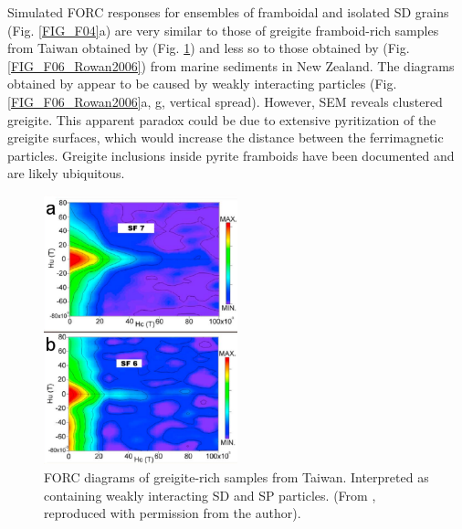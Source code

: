 Simulated FORC responses for ensembles of framboidal and isolated SD grains (Fig. \ref{FIG_F04}a) are very similar to those of greigite framboid-rich samples from Taiwan obtained by \citet{Chou2012} (Fig. \ref{FIG_F06_Chou2012}) and less so to those obtained by \citet{Rowan2006} (Fig. \ref{FIG_F06_Rowan2006}) from marine sediments in New Zealand. The diagrams obtained by \citet{Rowan2006} appear to be caused by weakly interacting particles (Fig. \ref{FIG_F06_Rowan2006}a, g, vertical spread). However, SEM reveals clustered greigite. This apparent paradox could be due to extensive pyritization of the greigite surfaces, which would increase the distance between the ferrimagnetic particles. Greigite inclusions inside pyrite framboids have been documented \citep{Ebert2018} and are likely ubiquitous.
\begin{figure}
\centering
\includegraphics[width=0.5\textwidth]{research-4/figs/Chou2012.pdf}
\caption[FORC diagram of greigite-rich samples from Taiwan]{FORC diagrams of greigite-rich samples from Taiwan. Interpreted as containing weakly interacting SD and SP particles. (From \citet{Chou2012}, reproduced with permission from the author).}
\label{FIG_F06_Chou2012}
\end{figure}

